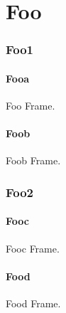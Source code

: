 \part{Foo}

\section{Foo1}

\subsection{Fooa}

\begin{frame}
    Foo Frame.
\end{frame}

\subsection{Foob}

\begin{frame}
    Foob Frame.
\end{frame}

\section{Foo2}

\subsection{Fooc}

\begin{frame}
    Fooc Frame.
\end{frame}

\subsection{Food}

\begin{frame}
    Food Frame.
\end{frame}